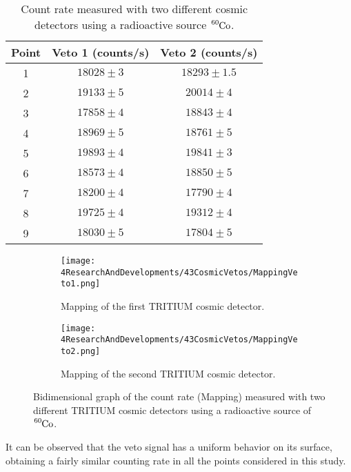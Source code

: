 \begin{enumerate}
\begin{table}[htbp]
\begin{center}
\begin{tabular}{|c|c|c|}
\hline
Point & Veto 1 (counts/s) & Veto 2 (counts/s)\\
\hline \hline \hline
1 & $18028\pm 3$ & $18293 \pm 1.5$ \\ \hline
2 & $19133 \pm 5$ & $20014 \pm 4$  \\ \hline
3 & $17858 \pm 4$ & $18843 \pm 4$  \\ \hline
4 & $18969 \pm 5$ & $18761 \pm 5$  \\ \hline
5 & $19893 \pm 4$ & $19841 \pm 3$  \\ \hline
6 & $18573 \pm 4$ & $18850 \pm 5$  \\ \hline
7 & $18200 \pm 4$ & $17790 \pm 4$  \\ \hline
8 & $19725 \pm 4$ & $19312 \pm 4$  \\ \hline
9 & $18030 \pm 5$ & $17804 \pm 5$  \\ \hline
\end{tabular}
\caption{Count rate measured with two different cosmic detectors using a radioactive source $\ce{^{60}Co}$.}
\label{tab:MappingDataVetos}
\end{center}
\end{table}

\begin{figure}
\centering
    \begin{subfigure}[b]{0.9\textwidth}
    \centering
    \texttt{[image: 4ResearchAndDevelopments/43CosmicVetos/MappingVeto1.png]}  
    \caption{Mapping of the first TRITIUM cosmic detector.\label{subfig:MappingVeto1}}
    \end{subfigure}
    \hfill
    \begin{subfigure}[b]{0.9\textwidth}
    \centering
    \texttt{[image: 4ResearchAndDevelopments/43CosmicVetos/MappingVeto2.png]}  
    \caption{Mapping of the second TRITIUM cosmic detector.\label{subfig:MappingVeto2}}
    \end{subfigure}
 \caption{Bidimensional graph of the count rate (Mapping) measured with two different TRITIUM cosmic detectors using a radioactive source of  $\ce{^{60}Co}$.}
 \label{fig:MappingVetos}
\end{figure}
It can be observed that the veto signal has a uniform behavior on its surface, obtaining a fairly similar counting rate in all the points considered in this study.

\end{enumerate}

